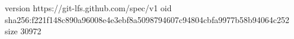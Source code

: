 version https://git-lfs.github.com/spec/v1
oid sha256:f221f148c890a96008e4e3ebf8a5098794607c94804cbfa9977b58b94064c252
size 30972
